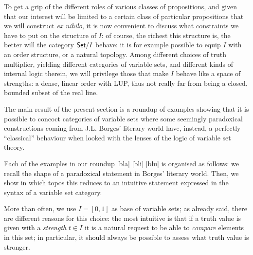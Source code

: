 To get a grip of the different roles of various classes of propositions, and given that our interest will be limited to a certain class of particular propositions that we will construct \emph{ex nihilo}, it is now convenient to discuss what constraints we have to put on the structure of $I$: of course, the richest this structure is, the better will the category $\mathsf{Set}/I$ behave: it is for example possible to equip $I$ with an order structure, or a natural topology. Among different choices of truth multiplier, yielding different categories of variable sets, and different kinds of internal logic therein, we will privilege those that make $I$ behave like a space of strengths: a dense, linear order with LUP, thus not really far from being a closed, bounded subset of the real line. 

The main result of the present section is a roundup of examples showing that it is possible to concoct categories of variable sets where some seemingly paradoxical constructions coming from J.L. Borges' literary world have, instead, a perfectly ``classical'' behaviour when looked with the lenses of the logic of variable set theory.

Each of the examples in our roundup \ref{bla} \ref{bli} \ref{blu} is organised as follows: we recall the shape of a paradoxical statement in Borges' literary world. Then, we show in which topos this reduces to an intuitive statement expressed in the syntax of a variable set category.

More than often, we use $I=[0,1]$ as base of variable sets; as already said, there are different reasons for this choice: the most intuitive is that if a truth value is given with a \emph{strength} $t\in I$ it is a natural request to be able to \emph{compare} elements in this set; in particular, it should always be possible to assess what truth value is stronger. 


